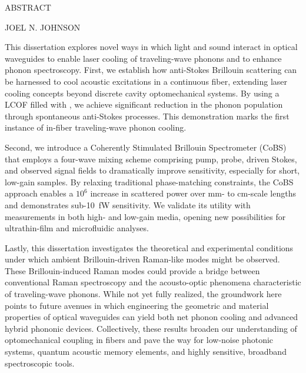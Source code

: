 {}

\begin{center}
    \large
    ABSTRACT

    \large
    \dissertationTitle{}

    \large
    \vspace{2mm}
    JOEL N. JOHNSON

\end{center}

\noindent

This dissertation explores novel ways in which light and sound interact in optical waveguides to enable laser cooling of traveling-wave phonons and to enhance phonon spectroscopy. First, we establish how anti-Stokes Brillouin scattering can be harnessed to cool acoustic excitations in a continuous fiber, extending laser cooling concepts beyond discrete cavity optomechanical systems. By using a \ac{LCOF} filled with , we achieve significant reduction in the phonon population through spontaneous anti-Stokes processes. This demonstration marks the first instance of in-fiber traveling-wave phonon cooling.

Second, we introduce a Coherently Stimulated Brillouin Spectrometer (\acs{CoBS}) that employs a four-wave mixing scheme comprising pump, probe, driven Stokes, and observed signal fields to dramatically improve sensitivity, especially for short, low-gain samples. By relaxing traditional phase-matching constraints, the CoBS approach enables a \(10^{6}\) increase in scattered power over \si{\milli\meter}- to \si{\centi\meter}-scale lengths and demonstrates sub-\SI{10}{\femto\watt} sensitivity. We validate its utility with measurements in both high- and low-gain media, opening new possibilities for ultrathin-film and microfluidic analyses.

Lastly, this dissertation investigates the theoretical and experimental conditions under which ambient Brillouin-driven Raman-like modes might be observed. These Brillouin-induced Raman modes could provide a bridge between conventional Raman spectroscopy and the acousto-optic phenomena characteristic of traveling-wave phonons. While not yet fully realized, the groundwork here points to future avenues in which engineering the geometric and material properties of optical waveguides can yield both net phonon cooling and advanced hybrid phononic devices. Collectively, these results broaden our understanding of optomechanical coupling in fibers and pave the way for low-noise photonic systems, quantum acoustic memory elements, and highly sensitive, broadband spectroscopic tools.
